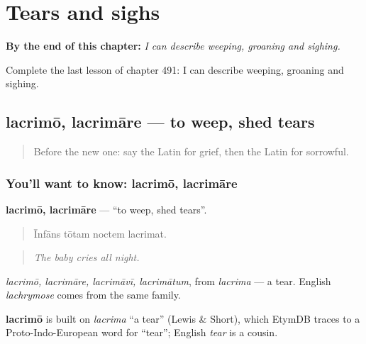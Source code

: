
\chapter{Tears and sighs}
\label{ch:la-tears-and-sighs}

\begin{chapteropening}
\textbf{By the end of this chapter:} \emph{I can describe weeping, groaning and sighing.}

Complete the last lesson of chapter 491: I can describe weeping, groaning and sighing.
\end{chapteropening}

\section[lacrimō, lacrimāre]{lacrimō, lacrimāre — to weep, shed tears}

\label{lesson:LA-C491-lacrimo}



\begin{quote}
Before the new one: say the Latin for grief, then the Latin for sorrowful.
\end{quote}

\subsection*{You'll want to know: lacrimō, lacrimāre}
\textbf{lacrimō, lacrimāre} — \textquotedblleft{}to weep, shed tears\textquotedblright{}.

\begin{quote}
Īnfāns tōtam noctem lacrimat.
\end{quote}

\begin{quote}
\emph{The baby cries all night.}
\end{quote}

\emph{lacrimō, lacrimāre, lacrimāvī, lacrimātum}, from \emph{lacrima} — a tear. English \emph{lachrymose} comes from the same family.

\begin{cousinweb}
\textbf{lacrimō} is built on \emph{lacrima} \textquotedblleft{}a tear\textquotedblright{} (Lewis \& Short), which EtymDB traces to a Proto-Indo-European word for \textquotedblleft{}tear\textquotedblright{}; English \emph{tear} is a cousin.
\end{cousinweb}

